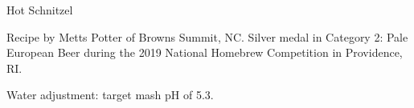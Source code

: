 \begin{recipe}{Hot Schnitzel} %

\begin{aboutblock}
Recipe by Metts Potter of Browns Summit, NC. Silver medal in Category 2: Pale
European Beer during the 2019 National Homebrew Competition in Providence, RI.
\sourceaha
\end{aboutblock}


\begin{methodandtiming}
 
\begin{mashsteps}
\end{mashsteps}

\begin{fermentationsteps}
\end{fermentationsteps}

\begin{directions}
Water adjustment: target mash pH of 5.3.
\end{directions}

\end{methodandtiming}

\recipebreak

\begin{ingredientsblock}

\begin{malts}
\end{malts}

\begin{hops}
\end{hops}


\end{ingredientsblock}

\end{recipe}


